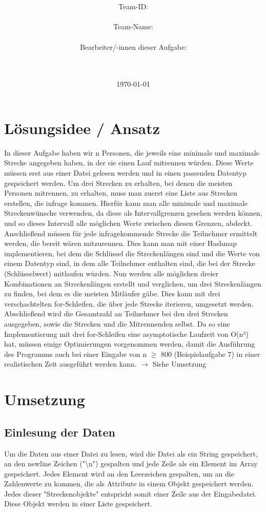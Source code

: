 \documentclass[a4paper,10pt,ngerman]{scrartcl}
\title{\textbf{\Huge\Aufgabe}}
\author{\LARGE Team-ID: \LARGE \TeamId \\\\
	    \LARGE Team-Name: \LARGE \TeamName \\\\
	    \LARGE Bearbeiter/-innen dieser Aufgabe: \\ 
	    \LARGE \Namen\\\\}
\date{\LARGE\today}
\begin{document}
\maketitle
\tableofcontents

\vspace{0.5cm}

\section{Lösungsidee / Ansatz}
In dieser Aufgabe haben wir n Personen, die jeweils eine minimale und maximale Strecke angegeben haben, in der sie einen Lauf mitrennen würden. Diese Werte müssen erst aus einer Datei gelesen werden und in einen passenden Datentyp gespeichert werden.
Um drei Strecken zu erhalten, bei denen die meisten Personen mitrennen, zu erhalten, muss man zuerst eine Liste aus Strecken erstellen, die infrage kommen. Hierfür kann man alle minimale und maximale Streckenwünsche verwenden,
da diese als Intervallgrenzen gesehen werden können, und so dieses Intervall alle möglichen Werte zwischen diesen Grenzen, abdeckt. Anschließend müssen für jede infragekommende Strecke die Teilnehmer ermittelt werden, die bereit wären mitzurennen.  
Dies kann man mit einer Hashmap implementieren, bei dem die Schlüssel die Streckenlängen sind und die Werte von einem Datentyp sind, in dem alle Teilnehmer enthalten sind, die bei der Strecke (Schlüsselwert) mitlaufen würden. 
Nun werden alle möglichen dreier Kombinationen an Streckenlängen erstellt und verglichen, um drei Streckenlängen zu finden, bei dem es die meisten Mitläufer gäbe. Dies kann mit drei verschachtelten for-Schleifen, die über jede Strecke iterieren, umgesetzt werden. 
Abschließend wird die Gesamtzahl an Teilnehmer bei den drei Strecken ausgegeben, sowie die Strecken und die Mitrennenden selbst.
\newline
Da so eine Implementierung mit drei for-Schleifen eine asymptotische Laufzeit von O(n³) hat, müssen einige Optimierungen vorgenommen werden, damit die Ausführung des Programms auch bei einer Eingabe von n $\geq$ 800 (Beispielaufgabe 7) in einer realistischen Zeit ausgeführt werden kann.
$\rightarrow$ Siehe Umsetzung


\section{Umsetzung}
\subsection{Einlesung der Daten}
Um die Daten aus einer Datei zu lesen, wird die Datei als ein String gespeichert, an den newline Zeichen ("\textbackslash n") gespalten und jede Zeile als ein Element im Array gespeichert. Jedes Element wird an den Leerzeichen gespalten, um an die Zahlenwerte zu kommen, die als Attribute in einem 
Objekt gespeichert werden. Jedes dieser "Streckenobjekte" entspricht somit einer Zeile aus der Eingabedatei. Diese Objekt werden in einer Liste gespeichert.
\end{document}
